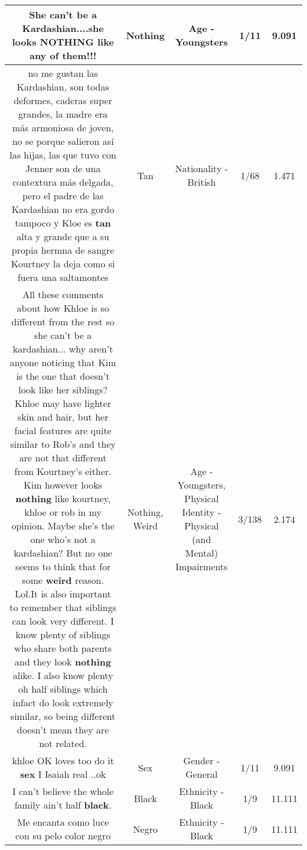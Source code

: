 \documentclass[11pt]{article}
\newlength\mylength
\begin{document}
\begin{center}
\begin{longtable}{|C{.65\mylength}|C{.30\mylength}|C{.12\mylength}|C{.12\mylength}|C{.12\mylength}|}
  \small She can't be a Kardashian....she looks \textbf{NOTHING} like any of them!!!\normalsize   & Nothing & Age - Youngsters & 1/11 & 9.091 \\  \hline
  \small no me gustan las Kardashian, son todas deformes, caderas super grandes, la madre era más armoniosa de joven, no se porque salieron así las hijas, las que tuvo con Jenner son de una contextura más delgada, pero el padre de las Kardashian no era gordo tampoco y Kloe es \textbf{tan} alta y grande que a su propia hermna de sangre  Kourtney la deja como si fuera una saltamontes\normalsize   & Tan & Nationality - British & 1/68 & 1.471 \\  \hline
  \small All these comments about how Khloe is so different from the rest so she can't be a kardashian... why aren't anyone noticing that Kim is the one that doesn't look like her siblings? Khloe may have lighter skin and hair, but her facial features are quite similar to Rob's and they are not that different from Kourtney's either. Kim however looks \textbf{nothing} like kourtney, khloe or rob in my opinion. Maybe she's the one who's not a kardashian? But no one seems to think that for some \textbf{weird} reason. Lol.It is also important to remember that siblings can look very different. I know plenty of siblings who share both parents and they look \textbf{nothing} alike. I also know plenty oh half siblings which infact do look extremely similar, so being different doesn't mean they are not related.\normalsize   & Nothing, Weird & Age - Youngsters, Physical Identity - Physical (and Mental) Impairments & 3/138 & 2.174 \\  \hline
  \small khloe OK loves too do it \textbf{sex} I Isaiah real ..ok\normalsize   & Sex & Gender - General & 1/11 & 9.091 \\  \hline
  \small I can't believe the whole family ain't half \textbf{black}.\normalsize   & Black & Ethnicity - Black & 1/9 & 11.111 \\  \hline
  \small Me encanta como luce con su pelo color negro\normalsize   & Negro & Ethnicity - Black & 1/9 & 11.111 \\  \hline

\end{longtable}
\end{center}
\end{document}
